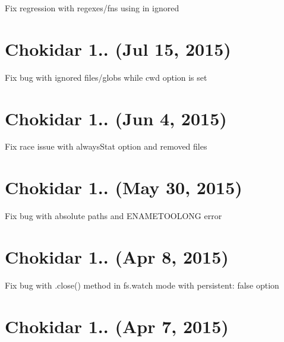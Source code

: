 \begin{DoxyItemize}
\item Fix regression with regexes/fns using in {\ttfamily ignored}
\end{DoxyItemize}

\section*{Chokidar 1.. (Jul 15, 2015)}


\begin{DoxyItemize}
\item Fix bug with {\ttfamily ignored} files/globs while {\ttfamily cwd} option is set
\end{DoxyItemize}

\section*{Chokidar 1.. (Jun 4, 2015)}


\begin{DoxyItemize}
\item Fix race issue with {\ttfamily always\+Stat} option and removed files
\end{DoxyItemize}

\section*{Chokidar 1.. (May 30, 2015)}


\begin{DoxyItemize}
\item Fix bug with absolute paths and E\+N\+A\+M\+E\+T\+O\+O\+L\+O\+NG error
\end{DoxyItemize}

\section*{Chokidar 1.. (Apr 8, 2015)}


\begin{DoxyItemize}
\item Fix bug with {\ttfamily .close()} method in {\ttfamily fs.\+watch} mode with {\ttfamily persistent\+: false} option
\end{DoxyItemize}

\section*{Chokidar 1.. (Apr 7, 2015)}


